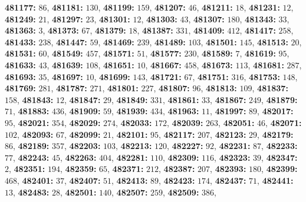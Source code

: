 \textsf{\bfseries 481177:} $86$, \textsf{\bfseries 481181:} $130$, \textsf{\bfseries 481199:} $159$, \textsf{\bfseries 481207:} $46$, \textsf{\bfseries 481211:} $18$, \textsf{\bfseries 481231:} $12$, \textsf{\bfseries 481249:} $21$, \textsf{\bfseries 481297:} $23$, \textsf{\bfseries 481301:} $12$, \textsf{\bfseries 481303:} $43$, \textsf{\bfseries 481307:} $180$, \textsf{\bfseries 481343:} $33$, \textsf{\bfseries 481363:} $3$, \textsf{\bfseries 481373:} $67$, \textsf{\bfseries 481379:} $18$, \textsf{\bfseries 481387:} $331$, \textsf{\bfseries 481409:} $412$, \textsf{\bfseries 481417:} $258$, \textsf{\bfseries 481433:} $238$, \textsf{\bfseries 481447:} $59$, \textsf{\bfseries 481469:} $239$, \textsf{\bfseries 481489:} $103$, \textsf{\bfseries 481501:} $145$, \textsf{\bfseries 481513:} $20$, \textsf{\bfseries 481531:} $60$, \textsf{\bfseries 481549:} $457$, \textsf{\bfseries 481571:} $51$, \textsf{\bfseries 481577:} $230$, \textsf{\bfseries 481589:} $7$, \textsf{\bfseries 481619:} $95$, \textsf{\bfseries 481633:} $43$, \textsf{\bfseries 481639:} $108$, \textsf{\bfseries 481651:} $10$, \textsf{\bfseries 481667:} $458$, \textsf{\bfseries 481673:} $113$, \textsf{\bfseries 481681:} $287$, \textsf{\bfseries 481693:} $35$, \textsf{\bfseries 481697:} $10$, \textsf{\bfseries 481699:} $143$, \textsf{\bfseries 481721:} $67$, \textsf{\bfseries 481751:} $316$, \textsf{\bfseries 481753:} $148$, \textsf{\bfseries 481769:} $281$, \textsf{\bfseries 481787:} $271$, \textsf{\bfseries 481801:} $227$, \textsf{\bfseries 481807:} $96$, \textsf{\bfseries 481813:} $109$, \textsf{\bfseries 481837:} $158$, \textsf{\bfseries 481843:} $12$, \textsf{\bfseries 481847:} $29$, \textsf{\bfseries 481849:} $331$, \textsf{\bfseries 481861:} $33$, \textsf{\bfseries 481867:} $249$, \textsf{\bfseries 481879:} $71$, \textsf{\bfseries 481883:} $436$, \textsf{\bfseries 481909:} $59$, \textsf{\bfseries 481939:} $434$, \textsf{\bfseries 481963:} $11$, \textsf{\bfseries 481997:} $89$, \textsf{\bfseries 482017:} $95$, \textsf{\bfseries 482021:} $354$, \textsf{\bfseries 482029:} $274$, \textsf{\bfseries 482033:} $172$, \textsf{\bfseries 482039:} $263$, \textsf{\bfseries 482051:} $46$, \textsf{\bfseries 482071:} $102$, \textsf{\bfseries 482093:} $67$, \textsf{\bfseries 482099:} $21$, \textsf{\bfseries 482101:} $95$, \textsf{\bfseries 482117:} $207$, \textsf{\bfseries 482123:} $29$, \textsf{\bfseries 482179:} $86$, \textsf{\bfseries 482189:} $357$, \textsf{\bfseries 482203:} $103$, \textsf{\bfseries 482213:} $120$, \textsf{\bfseries 482227:} $92$, \textsf{\bfseries 482231:} $87$, \textsf{\bfseries 482233:} $77$, \textsf{\bfseries 482243:} $45$, \textsf{\bfseries 482263:} $404$, \textsf{\bfseries 482281:} $110$, \textsf{\bfseries 482309:} $116$, \textsf{\bfseries 482323:} $39$, \textsf{\bfseries 482347:} $2$, \textsf{\bfseries 482351:} $194$, \textsf{\bfseries 482359:} $65$, \textsf{\bfseries 482371:} $212$, \textsf{\bfseries 482387:} $207$, \textsf{\bfseries 482393:} $180$, \textsf{\bfseries 482399:} $468$, \textsf{\bfseries 482401:} $37$, \textsf{\bfseries 482407:} $51$, \textsf{\bfseries 482413:} $89$, \textsf{\bfseries 482423:} $174$, \textsf{\bfseries 482437:} $71$, \textsf{\bfseries 482441:} $13$, \textsf{\bfseries 482483:} $28$, \textsf{\bfseries 482501:} $140$, \textsf{\bfseries 482507:} $259$, \textsf{\bfseries 482509:} $386$, 
